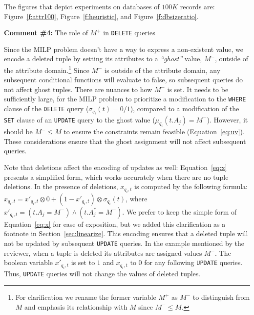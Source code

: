 The figures that depict experiments on databases of $100K$ records are:
Figure~\ref{f:attr100}, Figure~\ref{f:heuristic}, and
Figure~\ref{f:dbsizeratio}.

\comskip

\noindent
\textbf{Comment \#4:} The role of $M^+$ in \texttt{DELETE} queries
\begin{quote}
\end{quote}

Since the MILP problem doesn't have a way to express a non-existent value, we
encode a deleted tuple by setting its attributes to a \emph{``ghost''} value,
$M^-$, outside of the attribute domain.\footnote{For clarification we rename
the former variable $M^+$ as $M^-$ to distinguish from $M$ and emphasis its
relationship with $M$ since $M^- \leq M$.}
Since $M^-$ is outside of the attribute domain, any subsequent conditional
functions will evaluate to false, so subsequent queries do not affect ghost
tuples.
There are nuances to how $M^-$ is set. It needs to be sufficiently large, for
the MILP problem to prioritize a modification to the \texttt{WHERE} clause of
the \texttt{DELETE} query ($\sigma_{q_i}(t) = 0/1$), compared to a
modification of the \texttt{SET} clause of an \texttt{UPDATE} query to the
ghost value ($\mu_{q_i}(t.A_j) = M^-$). However, it should be $M^- \leq M $ to
ensure the constraints remain feasible (Equation~\ref{eq:uv}). These
considerations ensure that the ghost assignment will not affect subsequent
queries.

Note that deletions affect the encoding of updates as well:
Equation~\eqref{eq:x} presents a simplified form, which works accurately when
there are no tuple deletions. In the presence of deletions, $x_{q_i, t}$ is
computed by the following formula:
$x_{q_i, t} = x'_{q_i, t} \otimes 0 + (1-x'_{q_i, t}) \otimes \sigma_{q_i}(t)$, where
$x'_{q_i, t}= (t.A_j = M^-) \wedge (t.A_j^* = M^-)$.
We prefer to keep the simple form of Equation~\eqref{eq:x} for ease of
exposition, but we added this clarification as a footnote in
Section~\ref{sec:linearize}.
This encoding ensures that a deleted tuple will not be updated by subsequent \texttt{UPDATE} queries. 
In the example mentioned by the reviewer, when a tuple is deleted its attributes are assigned values $M^-$. 
The boolean variable $x'_{q_i, t}$ is set to $1$ and $x_{q_i, t}$ to $0$ for
any following \texttt{UPDATE} queries. Thus, \texttt{UPDATE} queries will not
change the values of deleted tuples.

